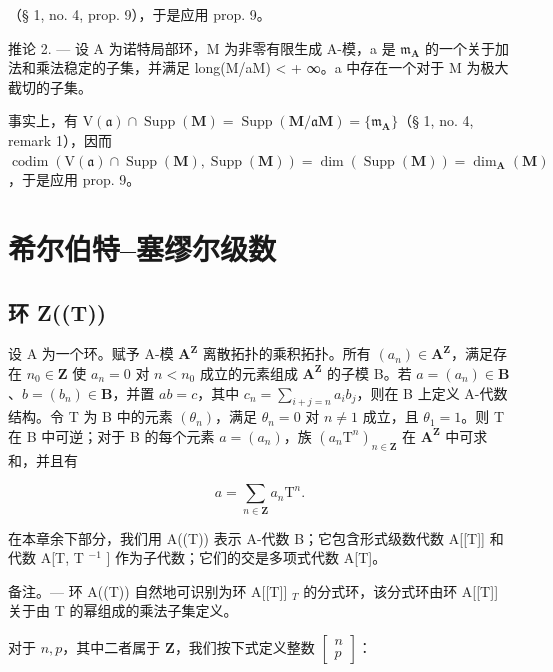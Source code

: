 （§ 1, no. 4, prop. 9），于是应用 prop. 9。

推论 2. --- 设 A 为诺特局部环，M 为非零有限生成 A-模，a 是 \(\mathfrak{m}_{\mathbf{A}}\) 的一个关于加法和乘法稳定的子集，并满足 long(M/aM) \textless{} + ∞。a 中存在一个对于 M 为极大截切的子集。

事实上，有 \(\mathrm{V}(\mathfrak{a}) \cap \operatorname{Supp}(\mathbf{M}) = \operatorname{Supp}(\mathbf{M}/\mathfrak{a}\mathbf{M}) = \{\mathfrak{m}_{\mathbf{A}}\}\)（§ 1, no. 4, remark 1），因而 \(\operatorname{codim}(\mathrm{V}(\mathfrak{a}) \cap \operatorname{Supp}(\mathbf{M}), \operatorname{Supp}(\mathbf{M})) = \dim(\operatorname{Supp}(\mathbf{M})) = \dim_{\mathbf{A}}(\mathbf{M})\)，于是应用 prop. 9。

\section{希尔伯特–塞缪尔级数}

\subsection{环 Z((T))}

设 A 为一个环。赋予 A-模 \(\mathbf{A}^{\mathbf{Z}}\) 离散拓扑的乘积拓扑。所有 \((a_{n})\in\mathbf{A}^{\mathbf{Z}}\)，满足存在 \(n_{0}\in\mathbf{Z}\) 使 \(a_{n}=0\) 对 \(n<n_{0}\) 成立的元素组成 \(\mathbf{A}^{\mathbf{Z}}\) 的子模 B。若 \(a=(a_{n})\in\mathbf{B}\)、\(b=(b_{n})\in\mathbf{B}\)，并置 \(ab=c\)，其中 \(c_{n}=\sum_{i+j=n}a_{i}b_{j}\)，则在 B 上定义 A-代数结构。令 T 为 B 中的元素 \((\theta_{n})\)，满足 \(\theta_{n}=0\) 对 \(n\neq1\) 成立，且 \(\theta_{1}=1\)。则 T 在 B 中可逆；对于 B 的每个元素 \(a=(a_{n})\)，族 \((a_{n}\mathrm{T}^{n})_{n\in\mathbf{Z}}\) 在 \(\mathbf{A}^{\mathbf{Z}}\) 中可求和，并且有

\[
a = \sum_ {n \in \mathbf {Z}} a _ {n} \mathrm{T} ^ {n}.
\]

在本章余下部分，我们用 A((T)) 表示 A-代数 B；它包含形式级数代数 A{[}{[}T{]}{]} 和代数 A{[}T, T \(^{-1}\) {]} 作为子代数；它们的交是多项式代数 A{[}T{]}。

备注。--- 环 A((T)) 自然地可识别为环 A{[}{[}T{]}{]} \(_{T}\) 的分式环，该分式环由环 A{[}{[}T{]}{]} 关于由 T 的幂组成的乘法子集定义。

对于 \(n, p\)，其中二者属于 \(\mathbf{Z}\)，我们按下式定义整数 \(\begin{bmatrix} n \\ p \end{bmatrix}\)：

